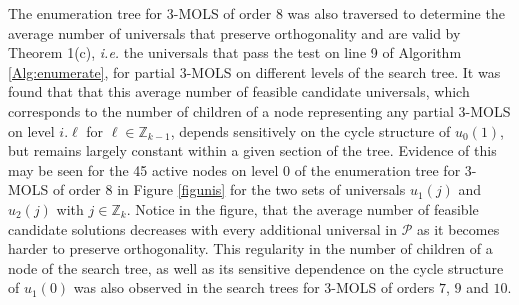 \documentclass[11pt, a4paper]{article}
\newcommand{\p}{\mathcal{P}}
\newcounter{ls}
\begin{document}
The enumeration tree for $3$-MOLS of order 8 was also traversed to determine the average number of universals that preserve orthogonality and are valid by Theorem 1(c), \emph{i.e.} the universals that pass the test on line 9 of Algorithm \ref{Alg:enumerate}, for partial $3$-MOLS on different levels of the search tree.
It was found that that this average number of feasible candidate universals, which corresponds to the number of children of a node representing any partial $3$-MOLS  on level $i.\ell$ for $\ell \in \mathbb{Z}_{k-1}$,  depends sensitively on the cycle structure of $u_0{(1)}$, but remains largely constant within a given section of the tree.  Evidence of this may be seen for the 45 active nodes on level 0 of the enumeration tree for $3$-MOLS of order $8$ in  Figure \ref{figunis} for the two sets of universals $u_1{(j)}$ and $u_2{(j)}$ with $j\in \mathbb{Z}_k$. Notice in the figure, that the average number of feasible candidate solutions decreases with every additional universal in $\p$ as it becomes harder to preserve orthogonality.  This  regularity in the number of children of a node of the search tree, as well as its sensitive dependence on the cycle structure of $u_1{(0)}$ was also observed in the search trees for $3$-MOLS of orders $7$, $9$ and $10$. 
\end{document}
